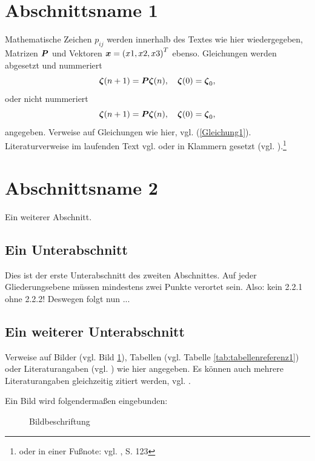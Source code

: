 \section{Abschnittsname 1}

Mathematische Zeichen $p_{ij}$ werden innerhalb des Textes wie hier wiedergegeben, Matrizen $\boldsymbol{P}$ und Vektoren  $\boldsymbol{x}=\left(x1, x2, x3\right)^T$ ebenso. Gleichungen werden abgesetzt und nummeriert
\begin{equation}
  \boldsymbol{\zeta}(n+1) = \boldsymbol{P} \boldsymbol{\zeta}(n), \quad \boldsymbol{\zeta}(0) = \boldsymbol{\zeta}_0,
\label{Gleichung1}
\end{equation}
oder nicht nummeriert
\begin{equation*}
  \boldsymbol{\zeta}(n+1) = \boldsymbol{P} \boldsymbol{\zeta}(n), \quad \boldsymbol{\zeta}(0) = \boldsymbol{\zeta}_0,
\end{equation*}
angegeben. Verweise auf Gleichungen wie hier, vgl. (\ref{Gleichung1}). Literaturverweise im laufenden Text vgl. \cite{sharpe1964} oder in Klammern gesetzt (vgl. \cite{sharpe1964}).\footnote{oder in einer Fu\ss{}note: vgl. \cite{sharpe1964}, S. 123}


\section{Abschnittsname 2}

Ein weiterer Abschnitt.

\subsection{Ein Unterabschnitt}

Dies ist der erste Unterabschnitt des zweiten Abschnittes. Auf jeder Gliederungsebene m\"ussen mindestens zwei Punkte verortet sein. Also: kein 2.2.1 ohne 2.2.2! Deswegen folgt nun ...

\subsection{Ein weiterer Unterabschnitt}

Verweise auf Bilder (vgl. Bild \ref{fig:bildreferenz1}), Tabellen (vgl. Tabelle \ref{tab:tabellenreferenz1}) oder Literaturangaben (vgl. \cite{sharpe1964}) wie hier angegeben. Es k\"onnen auch mehrere Literaturangaben gleichzeitig zitiert werden, vgl. \cite{sharpe1964, xyz2008}.

Ein Bild wird folgenderma\ss{}en eingebunden:

\begin{figure}[h]
  \centerline{}
  \caption{Bildbeschriftung}
  \label{fig:bildreferenz1}
\end{figure}

